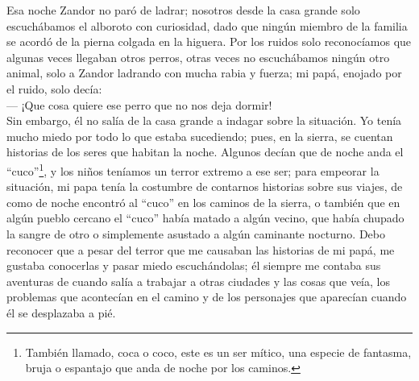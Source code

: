 Esa noche Zandor no paró de ladrar; nosotros desde la casa grande solo escuchábamos el alboroto con curiosidad, dado que ningún miembro de la familia se acordó de la pierna colgada en la higuera. Por los ruidos solo reconocíamos que algunas veces llegaban otros perros, otras veces no escuchábamos ningún otro animal, solo a Zandor ladrando con mucha rabia y fuerza; mi papá, enojado por el ruido, solo decía:\\\indent
--- ¡Que cosa quiere ese perro que no nos deja dormir!\\\indent
Sin embargo, él no salía de la casa grande a indagar sobre la situación. Yo tenía mucho miedo por todo lo que estaba sucediendo; pues, en la sierra, se cuentan historias de los seres que habitan la noche.
Algunos decían que de noche anda el ``cuco''\footnote{También llamado, coca o coco, este es un ser mítico, una especie de fantasma, bruja o espantajo que anda de noche por los caminos.}, y los niños teníamos un terror extremo a ese ser; para empeorar la situación, mi papa tenía la costumbre de contarnos historias sobre sus viajes, de como de noche encontró al ``cuco'' en los caminos de la sierra, o también que en algún pueblo cercano el ``cuco'' había matado a algún vecino, que había chupado la sangre de otro o simplemente asustado a algún caminante nocturno. Debo reconocer que a pesar del terror que me causaban las historias de mi papá, me gustaba conocerlas y pasar miedo escuchándolas; él siempre me contaba sus aventuras de cuando salía a trabajar a otras ciudades y las cosas que veía, los problemas que acontecían en el camino y de los personajes que aparecían cuando él se desplazaba a pié.

